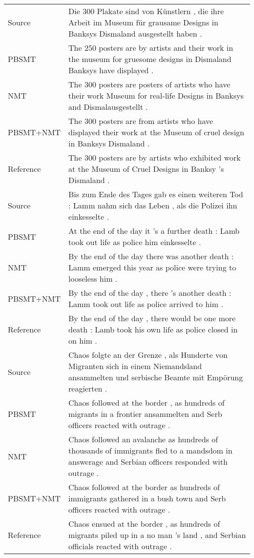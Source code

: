 \documentclass[11pt,a4paper]{article}
\begin{document}
{\begin{table*}[p]
{\begin{tabular}{ll}
        \midrule
    
        Source    & Die 300 Plakate sind von Künstlern , die ihre Arbeit im Museum für grausame Designs in Banksys Dismaland ausgestellt haben . \\
        PBSMT     & The 250 posters are by artists and their work in the museum for gruesome designs in Dismaland Banksys have displayed . \\
        NMT       & The 300 posters are posters of artists who have their work Museum for real-life Designs in Banksys and Dismalausgestellt . \\
        PBSMT+NMT & The 300 posters are from artists who have displayed their work at the Museum of cruel design in Banksys Dismaland . \\
        Reference & The 300 posters are by artists who exhibited work at the Museum of Cruel Designs in Banksy 's Dismaland . \\
    
        \midrule
    
        Source    & Bis zum Ende des Tages gab es einen weiteren Tod : Lamm nahm sich das Leben , als die Polizei ihn einkesselte . \\
        PBSMT     & At the end of the day it 's a further death : Lamb took out life as police him einkesselte . \\
        NMT       & By the end of the day there was another death : Lamm emerged this year as police were trying to looseless him . \\
        PBSMT+NMT & By the end of the day , there 's another death : Lamm took out life as police arrived to him . \\
        Reference & By the end of the day , there would be one more death : Lamb took his own life as police closed in on him . \\
    
        \midrule
    
        Source    & Chaos folgte an der Grenze , als Hunderte von Migranten sich in einem Niemandsland ansammelten und serbische Beamte mit Empörung reagierten . \\
        PBSMT     & Chaos followed at the border , as hundreds of migrants in a frontier ansammelten and Serb officers reacted with outrage . \\
        NMT       & Chaos followed an avalanche as hundreds of thousands of immigrants fled to a mandsdom in answerage and Serbian officers responded with outrage . \\
        PBSMT+NMT & Chaos followed at the border as hundreds of immigrants gathered in a bush town and Serb officers reacted with outrage . \\
        Reference & Chaos ensued at the border , as hundreds of migrants piled up in a no man 's land , and Serbian officials reacted with outrage . \\
    

\end{tabular}}
\end{table*}}
\end{document}
